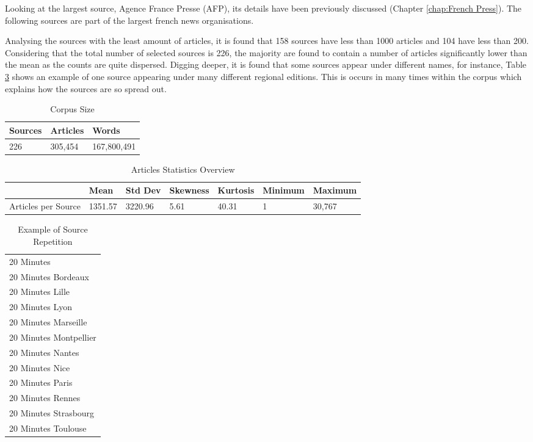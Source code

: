 Looking at the largest source, Agence France Presse (AFP), its details have been previously discussed (Chapter \ref{chap:French Press}). The following sources are part of the largest french news organisations.

Analysing the sources with the least amount of articles, it is found that 158 sources have less than 1000 articles and 104 have less than 200. Considering that the total number of selected sources is 226, the majority are found to contain a number of articles significantly lower than the mean as the counts are quite dispersed. Digging deeper, it is found that some sources appear under different names, for instance, Table \ref{tab:source repetition} shows an example of one source appearing under many different regional editions. This is occurs in many times within the corpus which explains how the sources are so spread out. 

\begin{table}[]
\centering
\caption{Corpus Size}
\label{tab: corpus size}
\begin{tabular}{lll}
\toprule
Sources & Articles & Words \\ \hline
226 & 305,454 & 167,800,491 \\
\bottomrule
\end{tabular}
\end{table}

\begin{table}[]
\centering
\caption{Articles Statistics Overview}
\label{tab:core stat source}
\begin{tabular}{@{}lllllll@{}}
\toprule
 & Mean & Std Dev & Skewness & Kurtosis & Minimum & Maximum \\ \midrule
Articles per Source & 1351.57 & 3220.96 & 5.61 & 40.31 & 1 & 30,767 \\ \bottomrule
\end{tabular}
\end{table}

\begin{table}[]
\caption{Example of Source Repetition}
\label{tab:source repetition}
\centering
\begin{tabular}{l}
\toprule
20 Minutes \\
20 Minutes Bordeaux \\
20 Minutes Lille \\
20 Minutes Lyon \\
20 Minutes Marseille \\
20 Minutes Montpellier \\
20 Minutes Nantes \\
20 Minutes Nice \\
20 Minutes Paris \\
20 Minutes Rennes \\
20 Minutes Strasbourg \\
20 Minutes Toulouse \\
\bottomrule
\end{tabular}
\end{table}

